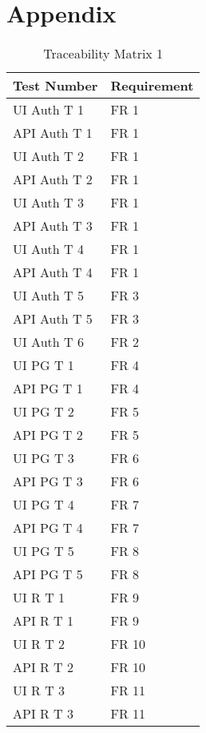 \documentclass[12pt, titlepage]{article}
\begin{document}
\newpage



\newpage

\section*{Appendix}

\begin{table}[H]
	\caption{Traceability Matrix 1} \label{TraceMatrix1}
	\begin{tabular}{ll}
		\toprule
		\textbf{Test Number} & \textbf{Requirement} \\
		\midrule
		UI Auth T 1 & FR 1\\
		API Auth T 1 & FR 1\\
		UI Auth T 2 & FR 1\\
		API Auth T 2 & FR 1\\
		UI Auth T 3 & FR 1\\
		API Auth T 3 & FR 1\\
		UI Auth T 4 & FR 1\\
		API Auth T 4 & FR 1\\
		UI Auth T 5 & FR 3\\
		API Auth T 5 & FR 3\\
		UI Auth T 6 & FR 2\\
		\midrule
		UI PG T 1 & FR 4\\
		API PG T 1 & FR 4\\
		UI PG T 2 & FR 5\\
		API PG T 2 & FR 5\\
		UI PG T 3 & FR 6\\
		API PG T 3 & FR 6\\
		UI PG T 4 & FR 7\\
		API PG T 4 & FR 7\\
		UI PG T 5 & FR 8\\
		API PG T 5 & FR 8\\
		\midrule
		UI R T 1 & FR 9\\
		API R T 1 & FR 9\\
		UI R T 2 & FR 10\\
		API R T 2 & FR 10\\
		UI R T 3 & FR 11\\
		API R T 3 & FR 11\\
		\bottomrule
	\end{tabular}
\end{table}
\end{document}
